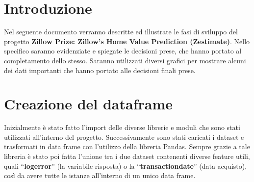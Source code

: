 \section*{Introduzione}

Nel seguente documento verranno descritte ed illustrate le fasi di sviluppo del progetto \textbf{Zillow Prize: Zillow’s Home Value Prediction (Zestimate)}.
Nello specifico saranno evidenziate e spiegate le decisioni prese, che hanno portato al completamento dello stesso.
Saranno utilizzati diversi grafici per mostrare alcuni dei dati importanti che hanno portato alle decisioni finali prese.

\section*{Creazione del dataframe}
Inizialmente è stato fatto l'import delle diverse librerie e moduli che sono stati utilizzati all'interno del progetto.
Successivamente sono stati caricati i dataset e trasformati in data frame con l'utilizzo della libreria Pandas. Sempre grazie a tale libreria è stato poi fatta 
l'unione tra i due dataset contenenti diverse feature utili, quali ``\textbf{logerror}'' (la variabile risposta) o la ``\textbf{transactiondate}'' (data acquisto), così da avere tutte 
le istanze all'interno di un unico data frame.

